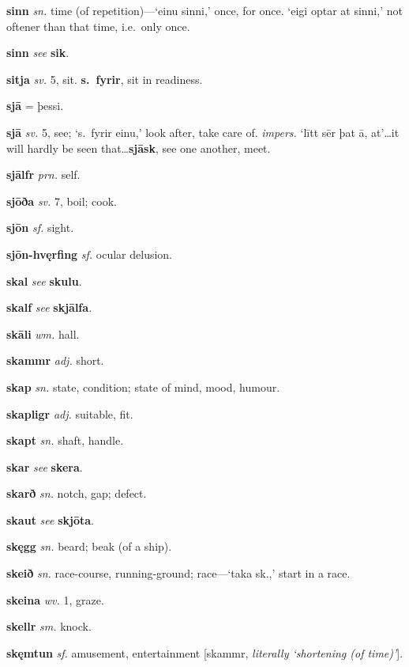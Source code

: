 \documentclass[12pt,letterpaper]{book}
\begin{document}
\noindent
\textbf{sinn} \textit{sn.} time (of repetition)---`einu sinni,' once,
	for once.  `eigi optar at sinni,' not oftener than that time,
	i.e.\ only once.

\noindent
\textbf{sinn} \textit{} \textit{see} \textbf{sik}.

\noindent
\textbf{sitja} \textit{sv.} 5, sit.  \textbf{s.\ fyrir}, sit in readiness.

\noindent
\textbf{sjā} \textit{} = þessi.

\noindent
\textbf{sjā} \textit{sv.} 5, see; `s.\ fyrir einu,' look after, take care of.
    \textit{impers.} `lītt sēr þat ā, at'\ldots it will hardly be seen
    that\ldots  \textbf{sjāsk}, see one another, meet.

\noindent
\textbf{sjālfr} \textit{prn.} self.

\noindent
\textbf{sjōða} \textit{sv.} 7, boil; cook.

\noindent
\textbf{sjōn} \textit{sf.} sight.

\noindent
\textbf{sjōn-hvęrfing} \textit{sf.} ocular delusion.

\noindent
\textbf{skal} \textit{} \textit{see} \textbf{skulu}.

\noindent
\textbf{skalf} \textit{} \textit{see} \textbf{skjālfa}.

\noindent
\textbf{skāli} \textit{wm.} hall.

\noindent
\textbf{skammr} \textit{adj.} short.

\noindent
\textbf{skap} \textit{sn.} state, condition; state of mind, mood, humour.

\noindent
\textbf{skapligr} \textit{adj.} suitable, fit.

\noindent
\textbf{skapt} \textit{sn.} shaft, handle.

\noindent
\textbf{skar} \textit{} \textit{see} \textbf{skera}.

\noindent
\textbf{skarð} \textit{sn.} notch, gap; defect.

\noindent
\textbf{skaut} \textit{} \textit{see} \textbf{skjōta}.

\noindent
\textbf{skęgg} \textit{sn.} beard; beak (of a ship).

\noindent
\textbf{skeið} \textit{sn.} race-course, running-ground;
	race---`taka sk.,' start in a race.

\noindent
\textbf{skeina} \textit{wv.} 1, graze.

\noindent
\textbf{skellr} \textit{sm.} knock.

\noindent
\textbf{skęmtun} \textit{sf.} amusement, entertainment [skammr,
	\textit{literally `shortening (of time)'}].
\end{document}
